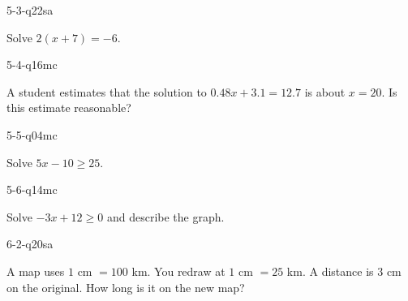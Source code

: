 \begin{practiceQuestion}{5-3-q22}{sa}
\begin{questionText}
Solve $2(x + 7) = -6$.
\end{questionText}
\end{practiceQuestion}

\begin{practiceQuestion}{5-4-q16}{mc}
\begin{questionText}
A student estimates that the solution to $0.48x + 3.1 = 12.7$ is about $x = 20$. Is this estimate reasonable?
\end{questionText}
\end{practiceQuestion}

\begin{practiceQuestion}{5-5-q04}{mc}
\begin{questionText}
Solve $5x - 10 \geq 25$.
\end{questionText}
\end{practiceQuestion}

\begin{practiceQuestion}{5-6-q14}{mc}
\begin{questionText}
Solve $-3x + 12 \geq 0$ and describe the graph.
\end{questionText}
\end{practiceQuestion}

\begin{practiceQuestion}{6-2-q20}{sa}
\begin{questionText}
A map uses $1$ cm $= 100$ km. You redraw at $1$ cm $= 25$ km. A distance is $3$ cm on the original. How long is it on the new map?
\end{questionText}
\end{practiceQuestion}

